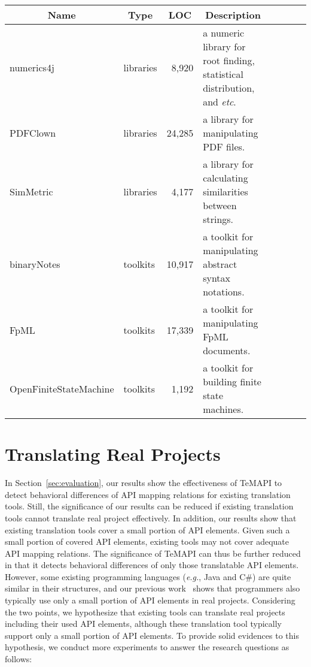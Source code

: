 \begin{table*}[t]
\centering
\begin{SmallOut}
\begin {tabular} {|l|l|r|l|c|c|c|c|}
\hline
\multicolumn{1}{|c|}{\textbf{Name}}& \multicolumn{1}{c|}{\textbf{Type}}& \multicolumn{1}{|c|}{\textbf{LOC} } &\multicolumn{1}{c|}{\textbf{Description}}\\
\hline\hline
numerics4j      &  libraries & 8,920   & a numeric library for root finding, statistical distribution, and \emph{etc}. \\
\hline
PDFClown    &  libraries  & 24,285   & a library for manipulating PDF files.\\
\hline
SimMetric & libraries & 4,177 & a library for calculating similarities between strings.\\
\hline
binaryNotes  &  toolkits & 10,917 &  a toolkit for manipulating abstract syntax notations.\\
\hline
FpML         &  toolkits   & 17,339  & a toolkit for manipulating FpML documents. \\
\hline
OpenFiniteStateMachine &  toolkits   & 1,192 & a toolkit for building finite state machines.\\
\hline
\end{tabular}%
 \label{table:subjects2}
\end{SmallOut}%
\end{table*}
\section{Translating Real Projects}
\label{sec:real}
In Section~\ref{sec:evaluation}, our results show the effectiveness of TeMAPI to detect behavioral differences of API mapping relations for existing translation tools. Still, the significance of our results can be reduced if existing translation tools cannot translate real project effectively. In addition, our results show that existing translation tools cover a small portion of API elements. Given such a small portion of covered API elements, existing tools may not cover adequate API mapping relations. The significance of TeMAPI can thus be further reduced in that it detects behavioral differences of only those translatable API elements. However, some existing programming languages (\emph{e.g.}, Java and C\#) are quite similar in their structures, and our previous work~\citep{thummalapentaase08spotweb} shows that programmers also typically use only a small portion of API elements in real projects. Considering the two points, we hypothesize that existing tools can translate real projects including their used API elements, although these translation tool typically support only a small portion of API elements. To provide solid evidences to this hypothesis, we conduct more experiments to answer the research questions as follows:

